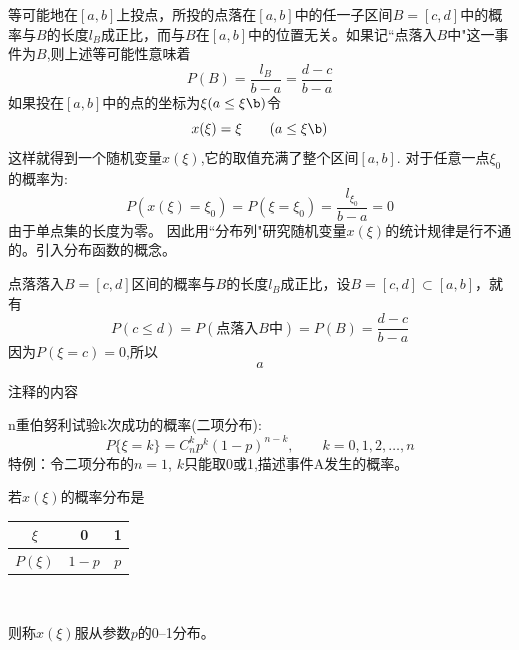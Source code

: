 \begin{frame}
\begin{example}
	等可能地在$[a,b]$上投点，所投的点落在$[a,b]$中的任一子区间$B=[c,d]$中的概率与$B$的长度$l_B$成正比，而与$B$在$[a,b]$中的位置无关。如果记``点落入$B$中"这一事件为$B$,则上述等可能性意味着
	\[P(B)=\frac{l_B}{b-a}=\frac{d-c}{b-a}\]
	如果投在$[a,b]$中的点的坐标为$\xi(a\le\xi\b)$令
	\[x(\xi)=\xi\qquad (a\le\xi\b)\]
	这样就得到一个随机变量$x(\xi)$,它的取值充满了整个区间$[a,b]$.
	对于任意一点$\xi_0$的概率为: 
	\[P(x(\xi)=\xi_0)=P(\xi=\xi_0)=\frac{l_{\xi_0}}{b-a}=0\]
	由于单点集的长度为零。
	因此用``分布列"研究随机变量$x(\xi)$的统计规律是行不通的。引入分布函数的概念。
\end{example}
\end{frame}

\begin{frame}
点落落入$B=[c,d]$区间的概率与$B$的长度$l_B$成正比，设$B=[c,d]\subset [a,b]$，就有
	\[P(c\le d)=P(\text{点落入$B$中})=P(B)=\frac{d-c}{b-a} \]
	因为$P(\xi =c)=0$,所以
	\[a\]
\end{frame}


注释的内容
\iffalse　　%

\begin{frame}
n重伯努利试验k次成功的概率(二项分布):
\[P\{\xi=k\}=C_{n}^{k}p^{k}(1-p)^{n-k},\qquad k=0,1,2,\dots,n\]
特例：令二项分布的$n=1$, $k$只能取0或1,描述事件A发生的概率。

\begin{definition}[0--1分布]
	若$x(\xi)$的概率分布是\\
	\begin{center}
	\begin{tabular}{|c|c|c|}
		\hline 
		$\xi$ & 0 & 1\\ 
		\hline 
		$P(\xi)$ & $1-p$ & $p$\\ 
		\hline 
	\end{tabular} \\
	\end{center}
	则称$x(\xi)$服从参数$p$的0--1分布。
\end{definition}

\end{frame}

